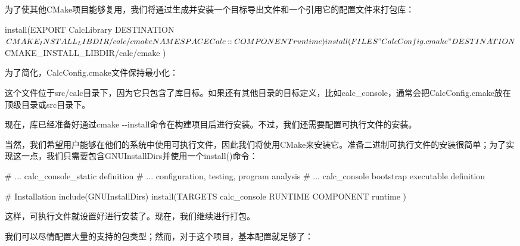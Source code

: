 为了使其他CMake项目能够复用，我们将通过生成并安装一个目标导出文件和一个引用它的配置文件来打包库：


\begin{cmake}
install(EXPORT CalcLibrary
    DESTINATION ${CMAKE_INSTALL_LIBDIR}/calc/cmake
    NAMESPACE Calc::
    COMPONENT runtime
)

install(FILES "CalcConfig.cmake"
    DESTINATION ${CMAKE_INSTALL_LIBDIR}/calc/cmake
)
\end{cmake}

为了简化，CalcConfig.cmake文件保持最小化：



这个文件位于src/calc目录下，因为它只包含了库目标。如果还有其他目录的目标定义，比如calc\_console，通常会把CalcConfig.cmake放在顶级目录或src目录下。

现在，库已经准备好通过cmake -{}-install命令在构建项目后进行安装。不过，我们还需要配置可执行文件的安装。


当然，我们希望用户能够在他们的系统中使用可执行文件，因此我们将使用CMake来安装它。准备二进制可执行文件的安装很简单；为了实现这一点，我们只需要包含GNUInstallDirs并使用一个install()命令：


\begin{cmake}
# ... calc_console_static definition
# ... configuration, testing, program analysis
# ... calc_console bootstrap executable definition

# Installation
include(GNUInstallDirs)
install(TARGETS calc_console
    RUNTIME COMPONENT runtime
)
\end{cmake}

这样，可执行文件就设置好进行安装了。现在，我们继续进行打包。


我们可以尽情配置大量的支持的包类型；然而，对于这个项目，基本配置就足够了：


